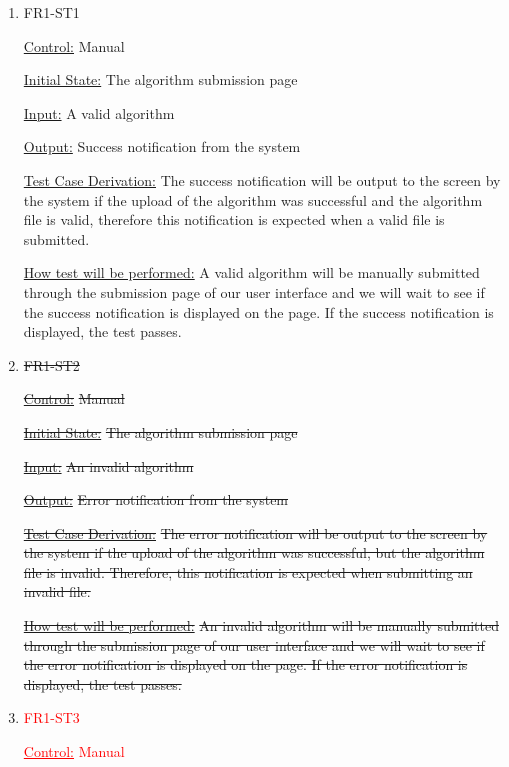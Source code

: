 \documentclass[12pt, titlepage]{article}
\begin{document}
\begin{enumerate}

\item{FR1-ST1\\}

\underline{Control:} Manual

\underline{Initial State:} The algorithm submission page

\underline{Input:} A valid algorithm 

\underline{Output:} Success notification from the system

\underline{Test Case Derivation:} The success notification will be output to the screen by the system if the upload of the algorithm was successful and the algorithm file is valid, therefore this notification is expected when a valid file is submitted. 

\underline{How test will be performed:} A valid algorithm will be manually submitted through the submission page of our user interface and we will wait to see if the success notification is displayed on the page. If the success notification is displayed, the test passes.
					
\item{\sout{FR1-ST2}\\}

\underline{\sout{Control:}} \sout{Manual}

\underline{\sout{Initial State:}} \sout{The algorithm submission page}

\underline{\sout{Input:}} \sout{An invalid algorithm}

\underline{\sout{Output:}} \sout{Error notification from the system}

\underline{\sout{Test Case Derivation:}} \sout{The error notification will be output to the screen by the system if the upload of the algorithm was successful, but the algorithm file is invalid. Therefore, this notification is expected when submitting an invalid file.}  

\underline{\sout{How test will be performed:}} \sout{An invalid algorithm will be manually submitted through the submission page of our user interface and we will wait to see if the error notification is displayed on the page. If the error notification is displayed, the test passes.}

\item\textcolor{red}{{FR1-ST3}\\}

\textcolor{red}{\underline{Control:} Manual}


\end{enumerate}
\end{document}
